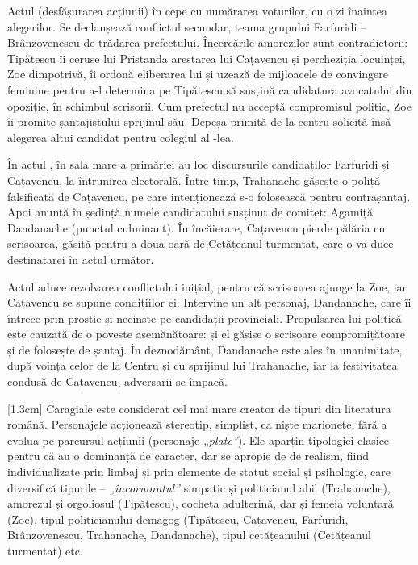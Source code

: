 \documentclass[
12pt,                        %
a4paper                      %
]{article}
\newcommand{\rom}[1]{\uppercase\expandafter{\romannumeral #1\relax}} %
\begin{document}
Actul \rom{2} (desfășurarea acțiunii) în cepe cu numărarea voturilor, cu o zi înaintea alegerilor. Se declanșează conflictul secundar, teama grupului Farfuridi -- Brânzovenescu de trădarea prefectului. Încercările amorezilor sunt contradictorii: Tipătescu îi ceruse lui Pristanda arestarea lui Cațavencu și percheziția locuinței, Zoe dimpotrivă, îi ordonă eliberarea lui și uzează de mijloacele de convingere feminine pentru a-l determina pe Tipătescu să susțină candidatura avocatului din opoziție, în schimbul scrisorii. Cum prefectul nu acceptă compromisul politic, Zoe îi promite șantajistului sprijinul său. Depeșa primită de la centru solicită însă alegerea altui candidat pentru colegiul al \rom{2}-lea.

În actul \rom{3}, în sala mare a primăriei au loc discursurile candidaților Farfuridi și Cațavencu, la întrunirea electorală. Între timp, Trahanache găsește o poliță falsificată de Cațavencu, pe care intenționează s-o folosească pentru contrașantaj. Apoi anunță în ședință numele candidatului susținut de comitet: Agamiță Dandanache (punctul culminant). În încăierare, Cațavencu pierde pălăria cu scrisoarea, găsită pentru a doua oară de Cetățeanul turmentat, care o va duce destinatarei în actul următor.

Actul \rom{4} aduce rezolvarea conflictului inițial, pentru că scrisoarea ajunge la Zoe, iar Cațavencu se supune condițiilor ei. Intervine un alt personaj, Dandanache, care îi întrece prin prostie și necinste pe candidații provinciali. Propulsarea lui politică este cauzată de o poveste asemănătoare: și el găsise o scrisoare compromițătoare și de folosește de șantaj. În deznodământ, Dandanache este ales în unanimitate, după voința celor de la Centru și cu sprijinul lui Trahanache, iar la festivitatea condusă de Cațavencu, adversarii se împacă.

[1.3cm]
Caragiale este considerat cel mai mare creator de tipuri din literatura română. Personajele acționează stereotip, simplist, ca niște marionete, fără a evolua pe parcursul acțiunii (personaje \textit{„plate”}). Ele aparțin tipologiei clasice pentru că au o dominanță de caracter, dar se apropie de de realism, fiind individualizate prin limbaj și prin elemente de statut social și psihologic, care diversifică tipurile -- \textit{„încornoratul”} simpatic și politicianul abil (Trahanache), amorezul și orgoliosul (Tipătescu), cocheta adulterină, dar și femeia voluntară (Zoe), tipul politicianului demagog (Tipătescu, Cațavencu, Farfuridi, Brânzovenescu, Trahanache, Dandanache), tipul cetățeanului (Cetățeanul turmentat) etc.
\end{document}
